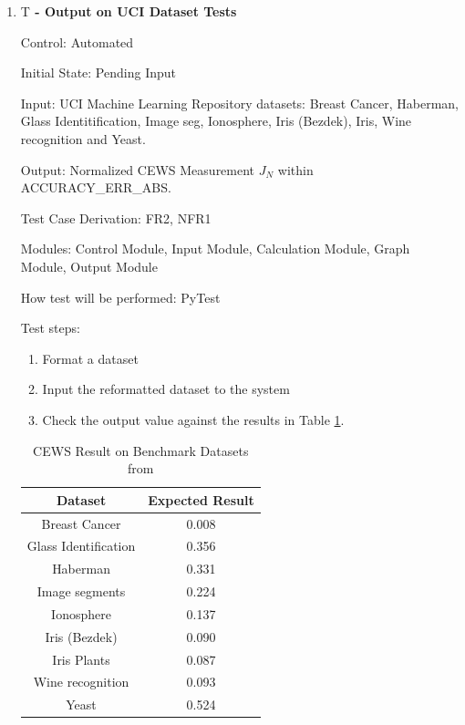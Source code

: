 \documentclass[12pt, titlepage]{article}
\newcounter{testnum} %
\begin{document}
\begin{enumerate}

\item{T\thetestnum \textbf{\label{T:paper} 
 - Output on UCI Dataset Tests}}

Control: Automated
					
Initial State: Pending Input
					
Input: UCI Machine Learning Repository datasets: Breast Cancer, Haberman, Glass Identitification, Image seg, Ionosphere, Iris (Bezdek), Iris, Wine recognition and Yeast.
					
Output: Normalized CEWS Measurement $J_N$ within ACCURACY\_ERR\_ABS.

Test Case Derivation: FR2, NFR1

Modules: Control Module, Input Module, Calculation Module, Graph Module, Output Module
					
How test will be performed: PyTest

Test steps:
\begin{enumerate}
\item Format a dataset
\item Input the reformatted dataset to the system
\item Check the output value against the results in Table \ref{Table:benchmarks}.
\end{enumerate}

\begin{table}[H]
\centering
\begin{tabular}{|c|c|} \hline
Dataset & Expected Result \\ \hline \hline
Breast Cancer & 0.008\\ \hline
Glass Identification & 0.356 \\ \hline
Haberman   & 0.331 \\ \hline
Image segments & 0.224 \\ \hline
Ionosphere & 0.137\\ \hline
Iris (Bezdek) & 0.090 \\ \hline
Iris Plants & 0.087 \\ \hline
Wine recognition & 0.093\\ \hline
Yeast & 0.524 \\ \hline
\end{tabular}
\caption{CEWS Result on Benchmark Datasets from \cite{zighed_statistical_2005}}
\label{Table:benchmarks}
\end{table}

\end{enumerate}
\end{document}
